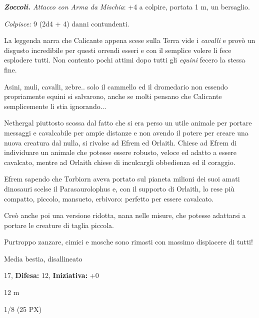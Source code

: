 \begin{multicols}{2}
{\emph{\textbf{Zoccoli.} Attacco con Arma da Mischia}: +4 a colpire, portata 1 m, un bersaglio.

\emph{Colpisce:} 9 (2d4 + 4) danni contundenti.


\begin{giocatore}[Il Saurovallo]
		La leggenda narra che Calicante appena scese sulla Terra vide i \emph{cavalli} e provò un disgusto incredibile per questi orrendi esseri e con il semplice volere li fece esplodere tutti. Non contento pochi attimi dopo tutti gli \emph{equini} fecero la stessa fine.

		Asini, muli, cavalli, zebre.. solo il cammello ed il dromedario non essendo propriamente equini si salvarono, anche se molti pensano che Calicante semplicemente li stia ignorando...

		Nethergal piuttosto scossa dal fatto che si era perso un utile animale per portare messaggi e cavalcabile per ampie distanze e non avendo il potere per creare una nuova creatura dal nulla, si rivolse ad Efrem ed Orlaith. Chiese ad Efrem di individuare un animale che potesse essere robusto, veloce ed adatto a essere cavalcato, mentre ad Orlaith chiese di inculcargli obbedienza ed il coraggio.

		Efrem sapendo che Torbiorn aveva portato sul pianeta milioni dei suoi amati dinosauri scelse il Parasaurolophus e, con il supporto di Orlaith, lo rese più compatto, piccolo, mansueto, erbivoro: perfetto per essere cavalcato.

		Creò anche poi una versione ridotta, nana nelle misure, che potesse adattarsi a portare le creature di taglia piccola.

		Purtroppo zanzare, cimici e mosche sono rimasti con massimo dispiacere di tutti!
\end{giocatore}

\begin{description}[noitemsep, topsep=0pt, parsep=0pt, partopsep=0pt, leftmargin=0cm, labelwidth=2.2cm]
    \item[\textbf{Taglia/Tipo:}] Media bestia, disallineato
    \item[\textbf{Caratt.:}] 
    \item[\textbf{Punti Ferita:}] 17,  \textbf{Difesa:} 12,  \textbf{Iniziativa:} +0
    \item[\textbf{Tiri Salvez.:}] 
    \item[\textbf{Movimento:}] 12 m
    \item[\textbf{Sfida:}] 1/8 (25 PX)\smallskip
\end{description}

}
\end{multicols}
